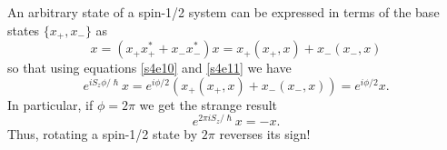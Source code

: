 \documentclass{article}
\numberwithin{equation}{section}
\theoremstyle{plain}
\numberwithin{thm}{section}
\theoremstyle{plain}
\numberwithin{prop}{section}
\theoremstyle{definition}
\numberwithin{defn}{section}
\theoremstyle{remark}
\begin{document}
An arbitrary state of a spin-1/2 system can be expressed in terms of the
base states $\{x_+, x_-\}$ as
\begin{equation}\label{s4e30}
x = (x_+x_+^\ast + x_-x_-^\ast)x = x_+(x_+, x) + x_-(x_-, x)
\end{equation}
so that using equations \eqref{s4e10} and \eqref{s4e11} we have
\begin{equation}\label{s4e31}
e^{iS_z\phi/\hslash}x = e^{i\phi/2}(x_+(x_+,x)+x_-(x_-,x))=e^{i\phi/2}x.
\end{equation}
In particular, if $\phi = 2\pi$ we get the strange result
\begin{equation}\label{s4e32}
e^{2\pi i S_z/\hslash}x = -x.
\end{equation}
Thus, rotating a spin-1/2 state by $2\pi$ reverses its sign!
\end{document}
